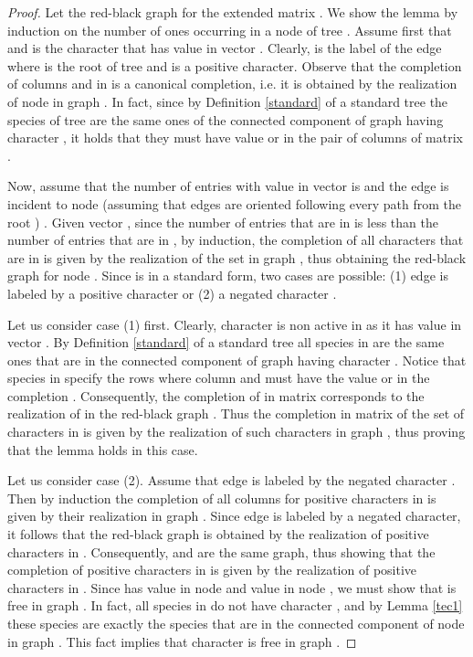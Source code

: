 \documentclass{llncs}
\newcommand{\grb}{ }
\begin{document}
\begin{proof}
Let  the red-black graph for the extended matrix .
We show the lemma by induction on the number  of ones occurring in a node  of tree . 
Assume first that  and  is the character that has value  in vector . Clearly,  is the  label of the edge  where  is the root of tree  and  is a positive character. Observe that the completion of columns  and  in  is a canonical completion, i.e.  it is obtained by the realization of node  in graph .   In fact,  since by  Definition \ref{standard} of a standard tree   the  species of tree   are  the same ones of the  connected component of graph \grb  having  character , it holds that they must have value   or  in  the pair of columns  of matrix . 


Now, assume that the number of entries with value  in  vector  is  and the edge   is incident to node  (assuming that edges are oriented following every path from the root ) .
Given vector , since the number of  entries that are  in  is less than the number of  entries that are  in ,  by induction, the completion of all characters   that are in  is given by the realization of the set  in graph , thus obtaining  the red-black graph   for node .   
Since  is in a standard form,   two cases are possible: (1) edge  is labeled by a positive character  or   (2) a negated character . 

Let us consider case (1) first.
Clearly, character  is non active in  as it has  value in vector .
 By Definition  \ref{standard} of a standard tree all species in  are the same ones that are in the  connected component of graph  having character .  Notice that    species in   specify    the rows where column  and  must have the value  or  in the  completion . Consequently, the completion of  in matrix  corresponds to the realization of  in the red-black graph . Thus the completion in matrix  of  the set  of  characters in  is given by the realization of such characters in graph , thus proving that the lemma holds in this case.
 
 
 
 
 
Let us consider case (2).
Assume that edge  is labeled by the negated character . Then by induction the completion of all columns for positive characters in  is given by their realization in graph . Since edge  is labeled by a negated character, it follows that the red-black graph  is obtained by the realization of  positive characters in .  Consequently,  and  are the same graph, thus showing that the completion of  positive characters in  is   given by the realization of positive characters in . Since  has value  in node  and value  in node , we must show that   is  free in graph . In fact,  all species in  do not have character , and by Lemma \ref{tec1} these species  are exactly the species that are  in the connected component of node  in graph . This fact implies that  character  is free in graph . 


\end{proof}
\end{document}
